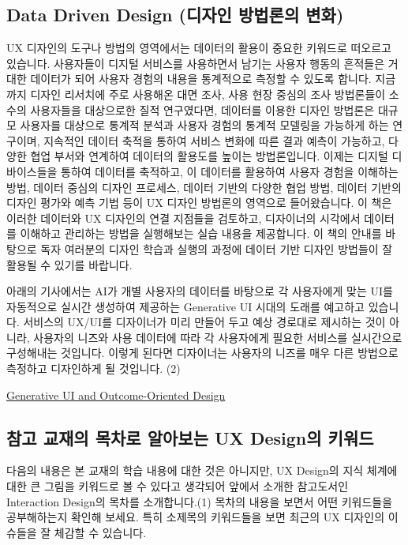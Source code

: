 \documentclass[
  letterpaper,
]{book}
\begin{document}
\subsection{Data Driven Design (디자인 방법론의
변화)}\label{data-driven-design-uxb514uxc790uxc778-uxbc29uxbc95uxb860uxc758-uxbcc0uxd654}

UX 디자인의 도구나 방법의 영역에서는 데이터의 활용이 중요한 키워드로
떠오르고 있습니다. 사용자들이 디지털 서비스를 사용하면서 남기는 사용자
행동의 흔적들은 거대한 데이터가 되어 사용자 경험의 내용을 통계적으로
측정할 수 있도록 합니다. 지금까지 디자인 리서치에 주로 사용해온 대면
조사, 사용 현장 중심의 조사 방법론들이 소수의 사용자들을 대상으로한 질적
연구였다면, 데이터를 이용한 디자인 방법론은 대규모 사용자를 대상으로
통계적 분석과 사용자 경험의 통계적 모델링을 가능하게 하는 연구이며,
지속적인 데이터 축적을 통하여 서비스 변화에 따른 결과 예측이 가능하고,
다양한 협업 부서와 연계하여 데이터의 활용도를 높이는 방법론입니다.
이제는 디지털 디바이스들을 통하여 데이터를 축적하고, 이 데이터를
활용하여 사용자 경험을 이해하는 방법, 데이터 중심의 디자인 프로세스,
데이터 기반의 다양한 협업 방법, 데이터 기반의 디자인 평가와 예측 기법
등이 UX 디자인 방법론의 영역으로 들어왔습니다. 이 책은 이러한 데이터와
UX 디자인의 연결 지점들을 검토하고, 디자이너의 시각에서 데이터를
이해하고 관리하는 방법을 실행해보는 실습 내용을 제공합니다. 이 책의
안내를 바탕으로 독자 여러분의 디자인 학습과 실행의 과정에 데이터 기반
디자인 방법들이 잘 활용될 수 있기를 바랍니다.

아래의 기사에서는 AI가 개별 사용자의 데이터를 바탕으로 각 사용자에게
맞는 UI를 자동적으로 실시간 생성하여 제공하는 Generative UI 시대의
도래를 예고하고 있습니다. 서비스의 UX/UI를 디자이너가 미리 만들어 두고
예상 경로대로 제시하는 것이 아니라, 사용자의 니즈와 사용 데이터에 따라
각 사용자에게 필요한 서비스를 실시간으로 구성해내는 것입니다. 이렇게
된다면 디자이너는 사용자의 니즈를 매우 다른 방법으로 측정하고 디자인하게
될 것입니다. (2)

\href{https://www.nngroup.com/articles/generative-ui/}{Generative UI and
Outcome-Oriented Design}

\subsection{참고 교재의 목차로 알아보는 UX Design의
키워드}\label{uxcc38uxace0-uxad50uxc7acuxc758-uxbaa9uxcc28uxb85c-uxc54cuxc544uxbcf4uxb294-ux-designuxc758-uxd0a4uxc6ccuxb4dc}

다음의 내용은 본 교재의 학습 내용에 대한 것은 아니지만, UX Design의 지식
체계에 대한 큰 그림을 키워드로 볼 수 있다고 생각되어 앞에서 소개한
참고도서인 Interaction Design의 목차를 소개합니다.(1) 목차의 내용을
보면서 어떤 키워드들을 공부해하는지 확인해 보세요. 특히 소제목의
키워드들을 보면 최근의 UX 디자인의 이슈들을 잘 체감할 수 있습니다.
\end{document}

